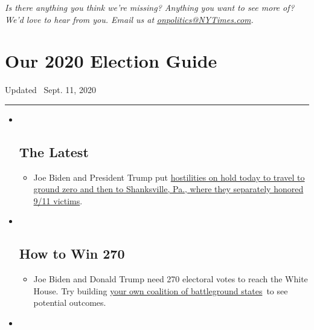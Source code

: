 \emph{Is there anything you think we're missing? Anything you want to
see more of? We'd love to hear from you. Email us at}
\href{mailto:onpolitics@NYTimes.com}{\emph{onpolitics@NYTimes.com}}\emph{.}

\hypertarget{our-2020-election-guide}{%
\section{Our 2020 Election Guide}\label{our-2020-election-guide}}

Updated ~Sept. 11, 2020

\begin{center}\rule{0.5\linewidth}{\linethickness}\end{center}

\begin{itemize}
\item ~
  \hypertarget{the-latest}{%
  \subsection{The Latest}\label{the-latest}}

  \begin{itemize}
  \item
    Joe Biden and President Trump put
    \href{https://www.nytimes3xbfgragh.onion/2020/09/11/us/politics/shanksville-trump-biden.html?action=click\&pgtype=Article\&state=default\&region=BELOW_MAIN_CONTENT\&context=storylines_guide}{hostilities
    on hold today to travel to ground zero and then to Shanksville, Pa.,
    where they separately honored 9/11 victims}.
  \end{itemize}
\item ~
  \hypertarget{how-to-win-270}{%
  \subsection{How to Win 270}\label{how-to-win-270}}

  \begin{itemize}
  \item
    Joe Biden and Donald Trump need 270 electoral votes to reach the
    White House. Try building
    \href{https://www.nytimes3xbfgragh.onion/interactive/2020/us/elections/election-states-biden-trump.html?action=click\&pgtype=Article\&state=default\&region=BELOW_MAIN_CONTENT\&context=storylines_guide}{your
    own coalition of battleground states}~to see potential outcomes.
  \end{itemize}
\item ~
  \hypertarget{voting-by-mail}{%
}
\end{itemize}
